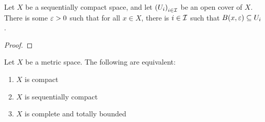 \begin{boxlemma}\label{Ch1:Lemma:Lebesgue_number_aux}
    Let $X$ be a sequentially compact space, and let $\left( U_i \right)_{i \in \mathcal{I}}$ be an open cover of $X$. There is some $\varepsilon > 0$ such that for all $x \in X$, there is $i \in \mathcal{I}$ such that $B\!\left( x, \varepsilon \right) \subseteq U_i$.
\end{boxlemma}
\begin{proof}
    \sorry %
\end{proof}

\begin{boxtheorem}\label{Ch1:Thm:compact_seq_compact_TFAE}
    Let $X$ be a metric space. The following are equivalent:
    \begin{enumerate}[label = (\arabic*)]
        \item $X$ is compact
        \item $X$ is sequentially compact
        \item $X$ is complete and totally bounded
    \end{enumerate}
\end{boxtheorem}

